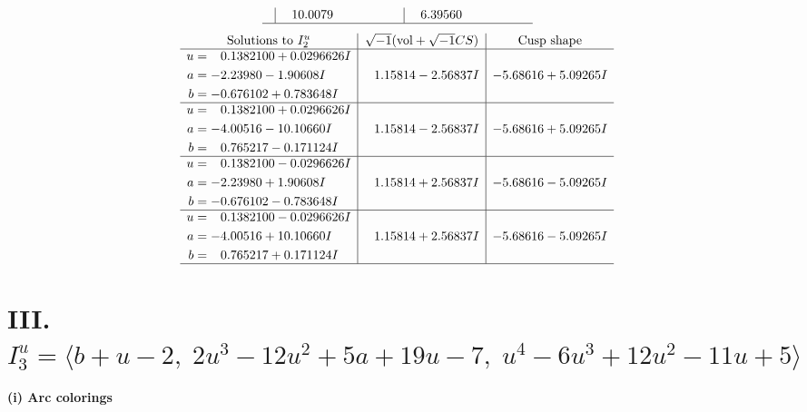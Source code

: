 \documentclass[1p]{elsarticle_modified}
\theoremstyle{definition}
\newcommand{\I}{\sqrt{-1}}
\begin{document}
$$\begin{array}{c|c|c}
 & \phantom{-}10.0079\phantom{ +0.000000I} & \phantom{-}6.39560\phantom{ +0.000000I}\\
 \hline 
 \end{array}$$\newpage$$\begin{array}{c|c|c}  
\text{Solutions to }I^u_{2}& \I (\text{vol} + \sqrt{-1}CS) & \text{Cusp shape}\\
 \hline 
\begin{aligned}
u &= \phantom{-}0.1382100 + 0.0296626 I \\
a &= -2.23980 - 1.90608 I \\
b &= -0.676102 + 0.783648 I\end{aligned}
 & \phantom{-}1.15814 - 2.56837 I & -5.68616 + 5.09265 I \\ \hline\begin{aligned}
u &= \phantom{-}0.1382100 + 0.0296626 I \\
a &= -4.00516 - 10.10660 I \\
b &= \phantom{-}0.765217 - 0.171124 I\end{aligned}
 & \phantom{-}1.15814 - 2.56837 I & -5.68616 + 5.09265 I \\ \hline\begin{aligned}
u &= \phantom{-}0.1382100 - 0.0296626 I \\
a &= -2.23980 + 1.90608 I \\
b &= -0.676102 - 0.783648 I\end{aligned}
 & \phantom{-}1.15814 + 2.56837 I & -5.68616 - 5.09265 I \\ \hline\begin{aligned}
u &= \phantom{-}0.1382100 - 0.0296626 I \\
a &= -4.00516 + 10.10660 I \\
b &= \phantom{-}0.765217 + 0.171124 I\end{aligned}
 & \phantom{-}1.15814 + 2.56837 I & -5.68616 - 5.09265 I\\
 \hline 
 \end{array}$$\newpage\newpage\renewcommand{\arraystretch}{1}
\centering \section*{III. $I^u_{3}= \langle b+u-2,\;2 u^3-12 u^2+5 a+19 u-7,\;u^4-6 u^3+12 u^2-11 u+5 \rangle$}
\flushleft \textbf{(i) Arc colorings}\\
\end{document}
